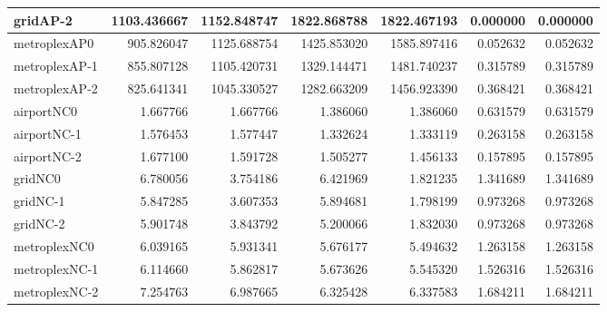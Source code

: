 \begin{longtable}{|l|r|r|r|r|r|r|}
gridAP-2 & 1103.436667 & 1152.848747 & 1822.868788 & 1822.467193 & 0.000000 & 0.000000 \\ \hline
metroplexAP0 & 905.826047 & 1125.688754 & 1425.853020 & 1585.897416 & 0.052632 & 0.052632 \\ \hline
metroplexAP-1 & 855.807128 & 1105.420731 & 1329.144471 & 1481.740237 & 0.315789 & 0.315789 \\ \hline
metroplexAP-2 & 825.641341 & 1045.330527 & 1282.663209 & 1456.923390 & 0.368421 & 0.368421 \\ \hline
airportNC0 & 1.667766 & 1.667766 & 1.386060 & 1.386060 & 0.631579 & 0.631579 \\ \hline
airportNC-1 & 1.576453 & 1.577447 & 1.332624 & 1.333119 & 0.263158 & 0.263158 \\ \hline
airportNC-2 & 1.677100 & 1.591728 & 1.505277 & 1.456133 & 0.157895 & 0.157895 \\ \hline
gridNC0 & 6.780056 & 3.754186 & 6.421969 & 1.821235 & 1.341689 & 1.341689 \\ \hline
gridNC-1 & 5.847285 & 3.607353 & 5.894681 & 1.798199 & 0.973268 & 0.973268 \\ \hline
gridNC-2 & 5.901748 & 3.843792 & 5.200066 & 1.832030 & 0.973268 & 0.973268 \\ \hline
metroplexNC0 & 6.039165 & 5.931341 & 5.676177 & 5.494632 & 1.263158 & 1.263158 \\ \hline
metroplexNC-1 & 6.114660 & 5.862817 & 5.673626 & 5.545320 & 1.526316 & 1.526316 \\ \hline
metroplexNC-2 & 7.254763 & 6.987665 & 6.325428 & 6.337583 & 1.684211 & 1.684211 \\ \hline
\end{longtable}
